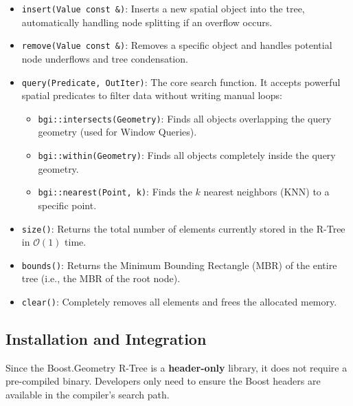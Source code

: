 \documentclass[a4paper, 10pt, titlepage]{report}
\begin{document}
\begin{itemize}
    \item \texttt{insert(Value const \&)}: Inserts a new spatial object into the tree, automatically handling node splitting if an overflow occurs.
    \item \texttt{remove(Value const \&)}: Removes a specific object and handles potential node underflows and tree condensation.
    \item \texttt{query(Predicate, OutIter)}: The core search function. It accepts powerful spatial predicates to filter data without writing manual loops:
    \begin{itemize}
        \item \texttt{bgi::intersects(Geometry)}: Finds all objects overlapping the query geometry (used for Window Queries).
        \item \texttt{bgi::within(Geometry)}: Finds all objects completely inside the query geometry.
        \item \texttt{bgi::nearest(Point, k)}: Finds the $k$ nearest neighbors (KNN) to a specific point.
    \end{itemize}
    \item \texttt{size()}: Returns the total number of elements currently stored in the R-Tree in $\mathcal{O}(1)$ time.
    \item \texttt{bounds()}: Returns the Minimum Bounding Rectangle (MBR) of the entire tree (i.e., the MBR of the root node).
    \item \texttt{clear()}: Completely removes all elements and frees the allocated memory.
\end{itemize}

\subsection{Installation and Integration}
Since the Boost.Geometry R-Tree is a \textbf{header-only} library, it does not require a pre-compiled binary. Developers only need to ensure the Boost headers are available in the compiler's search path.
\end{document}
